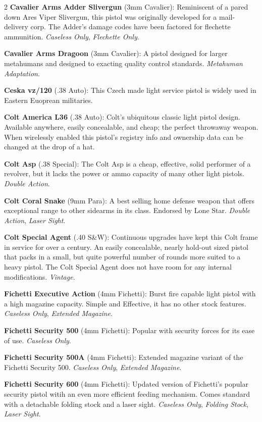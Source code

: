 \documentclass[
  oneside]{article}
\begin{document}
\begin{multicols}{2}
\textbf{Cavalier Arms Adder Slivergun} (3mm
Cavalier): Reminiscent of a pared down Ares Viper
Slivergun, this pistol was originally developed
for a mail-delivery corp. The Adder's damage codes
have been factored for flechette ammunition.
\emph{Caseless Only}, \emph{Flechette Only}.

\textbf{Cavalier Arms Dragoon} (3mm Cavalier): A
pistol designed for larger metahumans and designed
to exacting quality control standards.
\emph{Metahuman Adaptation}.

\textbf{Ceska vz/120} (.38 Auto): This Czech made
light service pistol is widely used in Eastern
Euoprean militaries.

\textbf{Colt America L36} (.38 Auto): Colt's
ubiquitous classic light pistol design. Available
anywhere, easily concealable, and cheap; the
perfect throwaway weapon. When wirelessly enabled
this pistol's registry info and ownership data can
be changed at the drop of a hat.

\textbf{Colt Asp} (.38 Special): The Colt Asp is a
cheap, effective, solid performer of a revolver,
but it lacks the power or ammo capacity of many
other light pistols. \emph{Double Action}.

\textbf{Colt Coral Snake} (9mm Para): A best
selling home defense weapon that offers
exceptional range to other sidearms in its class.
Endorsed by Lone Star. \emph{Double Action},
\emph{Laser Sight}.

\textbf{Colt Special Agent} (.40 S\&W): Continuous
upgrades have kept this Colt frame in service for
over a century. An easily concealable, nearly
hold-out sized pistol that packs in a small, but
quite powerful number of rounds more suited to a
heavy pistol. The Colt Special Agent does not have
room for any internal modifications.
\emph{Vintage}.

\textbf{Fichetti Executive Action} (4mm Fichetti):
Burst fire capable light pistol with a high
magazine capacity. Simple and Effective, it has no
other stock features. \emph{Caseless Only},
\emph{Extended Magazine}.

\textbf{Fichetti Security 500} (4mm Fichetti):
Popular with security forces for its ease of use.
\emph{Caseless Only}.

\textbf{Fichetti Security 500A} (4mm Fichetti):
Extended magazine variant of the Fichetti Security
500. \emph{Caseless Only}, \emph{Extended
Magazine}.

\textbf{Fichetti Security 600} (4mm Fichetti):
Updated version of Fichetti's popular security
pistol witih an even more efficient feeding
mechanism. Comes standard with a detachable
folding stock and a laser sight. \emph{Caseless
Only}, \emph{Folding Stock}, \emph{Laser Sight}.


\end{multicols}
\end{document}
